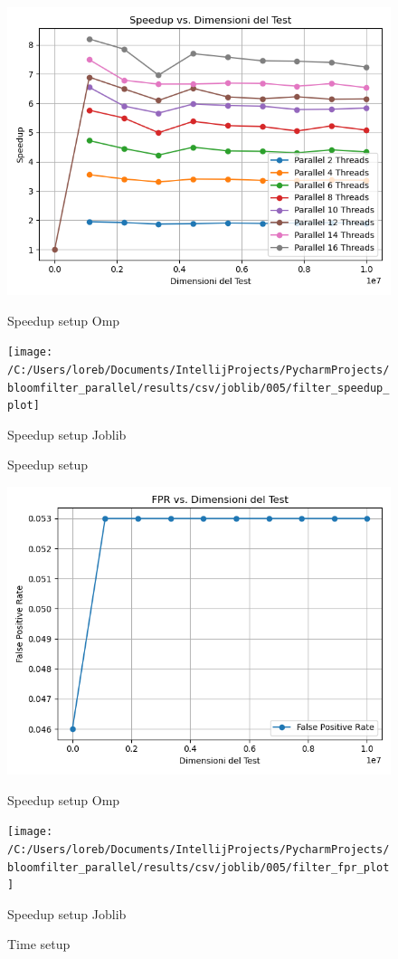 \documentclass[11pt]{article}
\begin{document}
    \begin{figure}[H]
        \centering
        \includegraphics[width=\linewidth]{omp/005/filter_speedup_plot}
            \caption{Speedup setup Omp}\label{fig:005-filter_speedup_omp}
        \endminipage\hfill
        \texttt{[image: /C:/Users/loreb/Documents/IntellijProjects/PycharmProjects/bloomfilter\_parallel/results/csv/joblib/005/filter\_speedup\_plot]}
            \caption{Speedup setup Joblib}\label{fig:005-filter_speedup_joblib}
        \endminipage\hfill
        \caption{Speedup setup}
    \end{figure}
    \begin{figure}[H]
        \centering
        \includegraphics[width=\linewidth]{omp/005/filter_fpr_plot}
            \caption{Speedup setup Omp}\label{fig:005-filter_fpr_omp}
        \endminipage\hfill
        \texttt{[image: /C:/Users/loreb/Documents/IntellijProjects/PycharmProjects/bloomfilter\_parallel/results/csv/joblib/005/filter\_fpr\_plot]}
            \caption{Speedup setup Joblib}\label{fig:005-filter_fpr_joblib}
        \endminipage\hfill
        \caption{Time setup}
    \end{figure}
\end{document}
